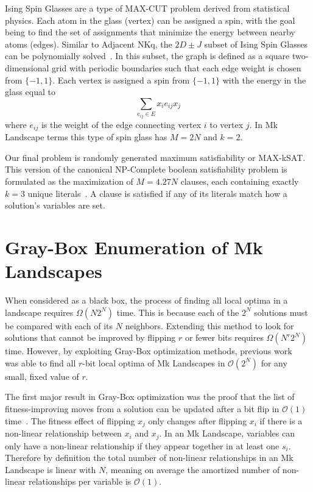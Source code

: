 \documentclass[runningheads,a4paper]{llncs}
\newcommand{\BigO}[1]{$\mathcal{O}{(#1)}$}
\begin{document}
Ising Spin Glasses are a type of MAX-CUT problem derived from statistical physics.
Each atom in the glass (vertex) can be assigned a spin, with the goal being to
find the set of assignments that minimize the energy between nearby atoms (edges).
Similar to Adjacent NKq, the $2D\pm J$ subset of Ising Spin Glasses can be polynomially
solved~\cite{saul:1994:spinglass}.
In this subset, the graph is defined as a square two-dimensional grid with
periodic boundaries such that each edge
weight is chosen from $\{-1, 1\}$. Each vertex is assigned a spin from $\{-1, 1\}$ with
the energy in the glass equal to
\begin{equation}
\sum_{e_{ij} \in E} x_ie_{ij}x_j
  \label{eq-ising}
\end{equation}
where $e_{ij}$ is the weight of the edge connecting vertex $i$ to vertex $j$. In Mk Landscape terms
this type of spin glass has $M=2N$ and $k=2$.

Our final problem is randomly generated maximum satisfiability or MAX-kSAT.
This version of the canonical NP-Complete boolean satisfiability problem is formulated
as the maximization of $M=4.27N$ clauses, each containing exactly $k=3$ unique literals~\cite{selman:1996:maxsat}.
A clause is satisfied if any of its literals match how a solution's variables are set.

\section{Gray-Box Enumeration of Mk Landscapes}
\label{sec-gray-box}
When considered as a black box, the process of finding all local optima
in a landscape requires $\Omega(N2^N)$ time. This is because each
of the $2^N$ solutions must be compared with each of its $N$ neighbors.
Extending this method to look for solutions that cannot be improved by
flipping $r$ or fewer bits requires $\Omega(N^r2^N)$ time. However,
by exploiting Gray-Box optimization methods, previous work~\cite{ochoa:2015:crossovernetworks}
was able to find all $r$-bit local optima of Mk Landscapes in \BigO{2^N} for any small,
fixed value of $r$.

The first major result in Gray-Box optimization was the proof that the list
of fitness-improving moves from a solution can be updated after a bit flip in \BigO{1}
time~\cite{whitley:2012:constant}.
The fitness effect of flipping $x_j$ only changes after flipping $x_i$ if
there is a non-linear relationship between $x_i$ and $x_j$.
In an Mk Landscape, variables
can only have a non-linear relationship if they appear together in at least one $s_i$.
Therefore by definition the total number of non-linear
relationships in an Mk Landscape is linear with $N$, meaning on average the amortized
number of non-linear relationships per variable is \BigO{1}.
\end{document}
